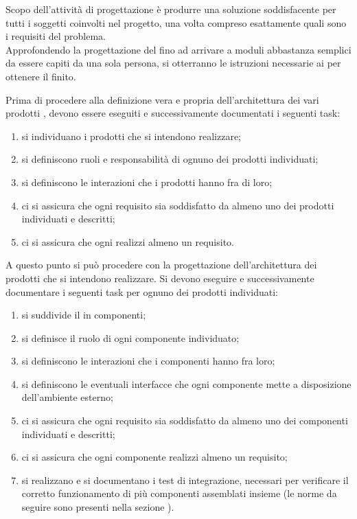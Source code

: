 		Scopo dell'attività di progettazione è produrre una soluzione soddisfacente per tutti i soggetti coinvolti nel progetto, una volta compreso esattamente quali sono i requisiti del problema. \\
		Approfondendo la progettazione del  fino ad arrivare a moduli abbastanza semplici da essere capiti da una sola persona, si otterranno le istruzioni necessarie ai  per ottenere il  finito.
			
			Prima di procedere alla definizione vera e propria dell'architettura dei vari prodotti , devono essere eseguiti e successivamente documentati i seguenti task:
			\begin{enumerate}
				\item si individuano i prodotti che si intendono realizzare;
				\item si definiscono ruoli e responsabilità di ognuno dei prodotti individuati;
				\item si definiscono le interazioni che i prodotti hanno fra di loro;
				\item ci si assicura che ogni requisito sia soddisfatto da almeno uno dei prodotti individuati e descritti;
				\item ci si assicura che ogni  realizzi almeno un requisito.
			\end{enumerate}
			A questo punto si può procedere con la progettazione dell'architettura dei prodotti  che si intendono realizzare. Si devono eseguire e successivamente documentare i seguenti task per ognuno dei prodotti individuati:
			\begin{enumerate}
				\item si suddivide il  in componenti;
				\item si definisce il ruolo di ogni componente individuato;
				\item si definiscono le interazioni che i componenti hanno fra loro;
				\item si definiscono le eventuali interfacce che ogni componente mette a disposizione dell'ambiente esterno;
				\item ci si assicura che ogni requisito sia soddisfatto da almeno uno dei componenti individuati e descritti;
				\item ci si assicura che ogni componente realizzi almeno un requisito;
				\item si realizzano e si documentano i test di integrazione, necessari per verificare il corretto funzionamento di più componenti assemblati insieme (le norme da seguire sono presenti nella sezione ).
			\end{enumerate}
